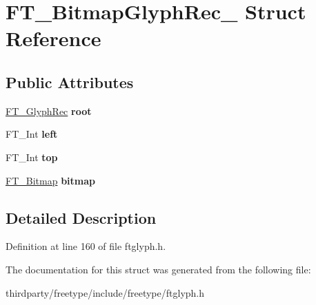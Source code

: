 \hypertarget{struct_f_t___bitmap_glyph_rec__}{}\section{F\+T\+\_\+\+Bitmap\+Glyph\+Rec\+\_\+ Struct Reference}
\label{struct_f_t___bitmap_glyph_rec__}
\subsection*{Public Attributes}
\begin{DoxyCompactItemize}
\item 
\mbox{\label{struct_f_t___bitmap_glyph_rec___ac3970353fbc0fe3d4c59c3fd608140f3}} 
\hyperlink{struct_f_t___glyph_rec__}{F\+T\+\_\+\+Glyph\+Rec} {\bfseries root}
\item 
\mbox{\label{struct_f_t___bitmap_glyph_rec___a6cfd2d89af7b6be4af886047c9cb7e0a}} 
F\+T\+\_\+\+Int {\bfseries left}
\item 
\mbox{\label{struct_f_t___bitmap_glyph_rec___a25fc81296678d6a2d064843c01bc05f7}} 
F\+T\+\_\+\+Int {\bfseries top}
\item 
\mbox{\label{struct_f_t___bitmap_glyph_rec___a16ecd0725920f8d5ad4c14e9448126ad}} 
\hyperlink{struct_f_t___bitmap__}{F\+T\+\_\+\+Bitmap} {\bfseries bitmap}
\end{DoxyCompactItemize}


\subsection{Detailed Description}


Definition at line 160 of file ftglyph.\+h.



The documentation for this struct was generated from the following file\+:\begin{DoxyCompactItemize}
\item 
thirdparty/freetype/include/freetype/ftglyph.\+h\end{DoxyCompactItemize}
